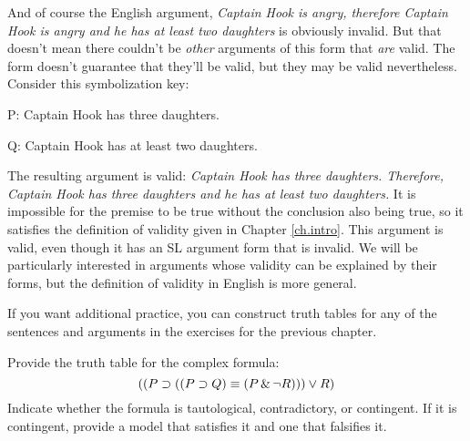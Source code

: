 And of course the English argument, \emph{Captain Hook is angry, therefore Captain Hook is angry and he has at least two daughters} is obviously invalid. But that doesn't mean there couldn't be \emph{other} arguments of this form that \emph{are} valid. The form doesn't guarantee that they'll be valid, but they may be valid nevertheless. Consider this symbolization key:

\begin{ekey}
\item[P:] Captain Hook has three daughters.
\item[Q:] Captain Hook has at least two daughters.
\end{ekey}

The resulting argument is valid: \emph{Captain Hook has three daughters. Therefore, Captain Hook has three daughters and he has at least two daughters.} It is impossible for the premise to be true without the conclusion also being true, so it satisfies the definition of validity given in Chapter \ref{ch.intro}. This argument is valid, even though it has an SL argument form that is invalid. We will be particularly interested in arguments whose validity can be explained by their forms, but the definition of validity in English is more general.

\practiceproblems
If you want additional practice, you can construct truth tables for any of the sentences and arguments in the exercises for the previous chapter.



\problempart
\label{HW2.E}
Provide the truth table for the complex formula:
$$((P \supset (( P \supset Q) \equiv (P \,\&\, \neg R))) \vee R)$$
Indicate whether the formula is tautological, contradictory, or contingent. If it is contingent, provide a model that satisfies it and one that falsifies it.


